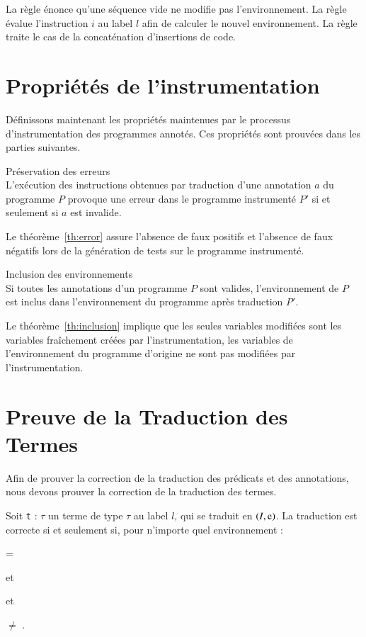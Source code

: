 La règle  énonce qu'une séquence vide ne modifie pas
l'environnement.
La règle  évalue l'instruction $i$ au label $l$ afin de
calculer le nouvel environnement.
La règle  traite le cas de la concaténation d'insertions de
code.


\section{Propriétés de l'instrumentation}
\label{sec:properties}


Définissons maintenant les propriétés maintenues par le processus
d'instrumentation des programmes annotés.
Ces propriétés sont prouvées dans les parties suivantes.


\begin{theorem}{Préservation des erreurs}\label{th:error}~\\
  L'exécution des instructions obtenues par traduction d'une annotation $a$ du
  programme $P$ provoque une erreur dans le programme instrumenté $P'$ si et
  seulement si $a$ est invalide.
\end{theorem}

Le théorème~\ref{th:error} assure l'absence de faux positifs et l'absence de
faux négatifs lors de la génération de tests sur le programme instrumenté.


\begin{theorem}{Inclusion des environnements}\label{th:inclusion}~\\
  Si toutes les annotations d'un programme $P$ sont valides, l'environnement de
  $P$ est inclus dans l'environnement du programme après traduction $P'$.
\end{theorem}

Le théorème~\ref{th:inclusion} implique que les seules variables modifiées sont
les variables fraîchement créées par l'instrumentation, les variables de
l'environnement du programme d'origine ne sont pas modifiées par
l'instrumentation.


\section{Preuve de la Traduction des Termes}
\label{sec:term-translation}

Afin de prouver la correction de la traduction des prédicats et des annotations,
nous devons prouver la correction de la traduction des termes.

\begin{lemma}
  \label{lem:term-correct}
  Soit \lstinline't' : $\tau$ un terme de type $\tau$ au label $l$, qui se
  traduit en $(I, \mbox{\lstinline'e'})$.
  La traduction est correcte si et seulement si, pour n'importe quel
  environnement \env :
  
   = 
  
  et
  
  \env \subenv {}

  et

   $\neq$ \errorenv.
\end{lemma}

